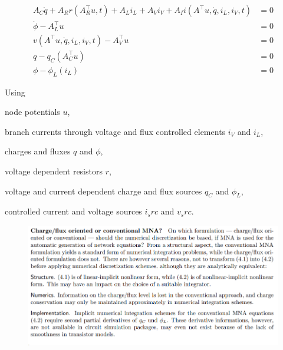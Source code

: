 \begin{align}
	A_C\dot{q} + A_R r(A_R^\top u,t) + A_L i_L + A_V i_V + A_I i(A^\top u, \dot{q}, i_L, i_V, t) &= 0 \label{charge/flux-1} \\
	\dot{\phi} - A_L^\top u &= 0 \label{charge/flux-2} \\
	v(A^\top u, \dot{q}, i_L, i_V, t) - A_V^\top u &= 0 \label{charge/flux-3} \\
	q - q_C(A_C^\top u) &= 0 \label{charge/flux-4} \\
	\phi - \phi_L(i_L) &= 0  \label{charge/flux-5} 
\end{align}

Using
\begin{description}
	\item node potentials $u$,
	\item branch currents through voltage and flux controlled elements $i_V$ and $i_L$,
	\item charges and fluxes $q$ and $\phi$,
	\item voltage dependent resistors $r$,
	\item voltage and current dependent charge and flux sources $q_C$ and $\phi_L$,
	\item controlled current and voltage sources $i_src$ and $v_src$.
\end{description} 

\begin{figure}[H]
	\centering
	\includegraphics[width=0.7\linewidth]{screenshot007}
	\caption{}
	\label{fig:screenshot007}
\end{figure}
